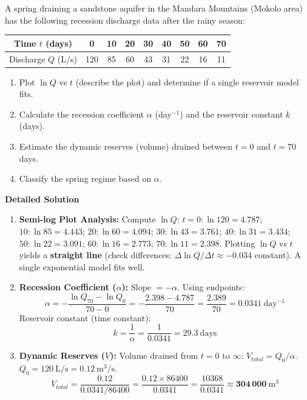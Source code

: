 \documentclass[11pt]{article}
\begin{document}
\begin{exoresolu}
A spring draining a sandstone aquifer in the Mandara Mountains (Mokolo area) has the following recession discharge data after the rainy season:
\begin{center}
\begin{tabular}{|c|c|c|c|c|c|c|c|c|}
\hline
Time $t$ (days) & 0 & 10 & 20 & 30 & 40 & 50 & 60 & 70 \\
\hline
Discharge $Q$ (L/s) & 120 & 85 & 60 & 43 & 31 & 22 & 16 & 11 \\
\hline
\end{tabular}
\end{center}
\begin{enumerate}
    \item Plot $\ln Q$ vs $t$ (describe the plot) and determine if a single reservoir model fits.
    \item Calculate the recession coefficient $\alpha$ (day$^{-1}$) and the reservoir constant $k$ (days).
    \item Estimate the dynamic reserves (volume) drained between $t=0$ and $t=70$ days.
    \item Classify the spring regime based on $\alpha$.
\end{enumerate}
\tcblower
\textbf{Detailed Solution}
\begin{enumerate}
    \item \textbf{Semi-log Plot Analysis:}
    Compute $\ln Q$:
    $t=0: \ln 120 = 4.787$; $10: \ln 85 = 4.443$; $20: \ln 60 = 4.094$; $30: \ln 43 = 3.761$;
    $40: \ln 31 = 3.434$; $50: \ln 22 = 3.091$; $60: \ln 16 = 2.773$; $70: \ln 11 = 2.398$.
    Plotting $\ln Q$ vs $t$ yields a \textbf{straight line} (check differences: $\Delta \ln Q / \Delta t \approx -0.034$ constant). A single exponential model fits well.
    \item \textbf{Recession Coefficient ($\alpha$):}
    Slope $= -\alpha$. Using endpoints:
    \[ \alpha = -\frac{\ln Q_{70} - \ln Q_0}{70 - 0} = -\frac{2.398 - 4.787}{70} = \frac{2.389}{70} = \mathbf{0.0341\ \mathrm{day^{-1}}} \]
    Reservoir constant (time constant):
    \[ k = \frac{1}{\alpha} = \frac{1}{0.0341} = \mathbf{29.3\ \mathrm{days}} \]
    \item \textbf{Dynamic Reserves ($V$):}
    Volume drained from $t=0$ to $\infty$: $V_{total} = Q_0 / \alpha$.
    $Q_0 = 120\ \mathrm{L/s} = 0.12\ \mathrm{m^3/s}$.
    \[ V_{total} = \frac{0.12}{0.0341 / 86400} = \frac{0.12 \times 86400}{0.0341} = \frac{10368}{0.0341} \approx \mathbf{304\,000\ \mathrm{m^3}} \]

\end{enumerate}
\end{exoresolu}
\end{document}
